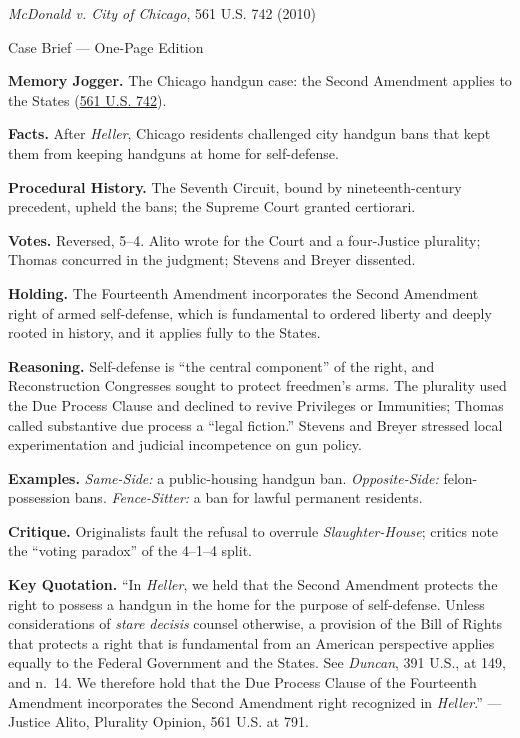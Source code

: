 \documentclass[12pt]{article}
\begin{document}
\begin{center}
{\Large \textit{McDonald v. City of Chicago}, 561 U.S. 742 (2010)\par}
\vspace{0.3em}
{\normalsize Case Brief --- One-Page Edition\par}
\end{center}

\textbf{Memory Jogger.} The Chicago handgun case: the Second Amendment applies to the States (\href{https://www.courtlistener.com/opinion/149702/mcdonald-v-city-of-chicago/}{561 U.S. 742}).

\textbf{Facts.} After \textit{Heller}, Chicago residents challenged city handgun bans that kept them from keeping handguns at home for self-defense.

\textbf{Procedural History.} The Seventh Circuit, bound by nineteenth-century precedent, upheld the bans; the Supreme Court granted certiorari.

\textbf{Votes.} Reversed, 5--4. Alito wrote for the Court and a four-Justice plurality; Thomas concurred in the judgment; Stevens and Breyer dissented.

\textbf{Holding.} The Fourteenth Amendment incorporates the Second Amendment right of armed self-defense, which is fundamental to ordered liberty and deeply rooted in history, and it applies fully to the States.

\textbf{Reasoning.} Self-defense is ``the central component'' of the right, and Reconstruction Congresses sought to protect freedmen's arms. The plurality used the Due Process Clause and declined to revive Privileges or Immunities; Thomas called substantive due process a ``legal fiction.'' Stevens and Breyer stressed local experimentation and judicial incompetence on gun policy.

\textbf{Examples.} \emph{Same-Side:} a public-housing handgun ban. \emph{Opposite-Side:} felon-possession bans. \emph{Fence-Sitter:} a ban for lawful permanent residents.

\textbf{Critique.} Originalists fault the refusal to overrule \textit{Slaughter-House}; critics note the ``voting paradox'' of the 4--1--4 split.

\textbf{Key Quotation.} ``In \textit{Heller}, we held that the Second Amendment protects the right to possess a handgun in the home for the purpose of self-defense. Unless considerations of \textit{stare decisis} counsel otherwise, a provision of the Bill of Rights that protects a right that is fundamental from an American perspective applies equally to the Federal Government and the States. See \textit{Duncan}, 391 U.S., at 149, and n.~14. We therefore hold that the Due Process Clause of the Fourteenth Amendment incorporates the Second Amendment right recognized in \textit{Heller}.'' --- Justice Alito, Plurality Opinion, 561 U.S. at 791.
\end{document}

